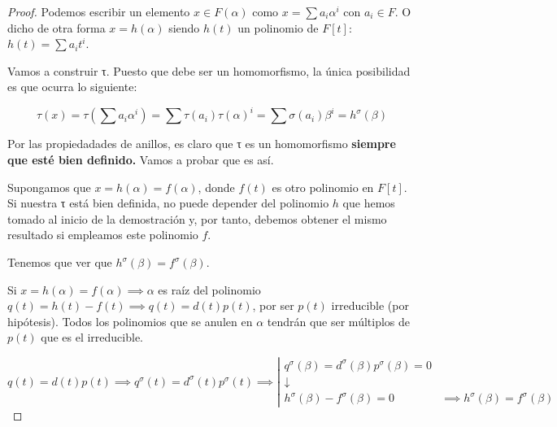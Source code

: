 \documentclass{apuntes}
\begin{document}
\begin{proof} Podemos escribir un elemento $x ∈ F(α)$ como $x = \sum a_iα^i$ con $a_i∈F$. O dicho de otra forma $x=h(α)$ siendo $h(t)$ un polinomio de $F[t]$: $h(t)=\sum a_it^i$.

Vamos a construir τ. Puesto que debe ser un homomorfismo, la única posibilidad es que ocurra lo siguiente:

\[τ(x) = τ\left(\sum a_iα^i\right) = \sum τ(a_i)τ(α)^i = \sum σ(a_i)β^i = h^σ(β)\]

Por las propiedadades de anillos, es claro que τ es un homomorfismo \textbf{siempre que esté bien definido.} Vamos a probar que es así.

Supongamos que $x=h(α) = f(α)$, donde $f(t)$ es otro polinomio en $F[t]$. Si nuestra τ está bien definida, no puede depender del polinomio $h$ que hemos tomado al inicio de la demostración y, por tanto, debemos obtener el mismo resultado si empleamos este polinomio $f$.

Tenemos que ver que $h^σ(β) = f^σ(β)$.

Si $x= h(α) = f(α) \implies α$ es raíz del polinomio $q(t) = h(t)-f(t) \implies q(t) = d(t)p(t)$, por ser $p(t)$ irreducible (por hipótesis). Todos los polinomios que se anulen en $α$ tendrán que ser múltiplos de $p(t)$ que es el irreducible.

\[q(t) = d(t)p(t) \implies q^σ(t) = d^σ(t) p^σ(t) \implies \left| \begin{array}{cc}
q^σ(β) = d^σ(β) p^σ(β) = 0&\\
\downarrow&\\
h^σ(β) - f^σ(β)=0&\implies h^σ(β) = f^σ(β)
\end{array}\right.\]
\end{proof}




\end{document}
